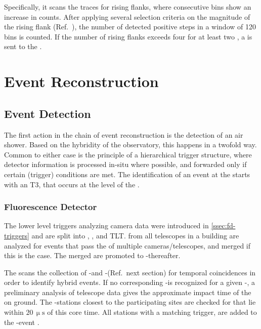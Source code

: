 Specifically, it scans the \LPMT traces for rising flanks, where consecutive 
bins show an increase in \ADC counts. After applying several selection criteria
on the magnitude of the rising flank (Ref.\ 
\cite{colemanNewTriggerSettings2018}), the number of detected positive steps in
a window of 120 bins is counted. If the number of rising flanks exceeds four 
for at least two \LPMTs, a \TTWO is sent to the \CDAS.


\section{Event Reconstruction}
\label{sec:event-reconstruction}

\halflift

\subsection{Event Detection}
\label{ssec:cdas}

The first action in the chain of \EAS event reconstruction is the detection of
an air shower. Based on the hybridity of the observatory, this happens in a 
twofold way. Common to either case is the principle of a hierarchical trigger
structure, where detector information is processed in-situ where possible, and 
forwarded only if certain (trigger) conditions are met. The identification of
an \EAS event at the \PAO starts with an \acf{T3}, that occurs at the level of
the \CDAS.

\subsubsection{Fluorescence Detector}

The lower level triggers analyzing camera data were introduced in 
\cref{ssec:fd-triggers} and are split into \FLT, \SLT, and \acf{TLT}. \TLTs 
from all telescopes in a building are analyzed for events that pass the \FOV of
multiple cameras/telescopes, and merged if this is the case. The merged \TLTs 
are promoted to \FD-\TTHREEs thereafter.

The \CDAS scans the collection of \FD-\TTHREEs and \SD-\TTHREEs (Ref.\ next 
section) for temporal coincidences in order to identify hybrid events. If no
corresponding \SD-\TTHREE is recognized for a given \FD-\TTHREE, a preliminary
analysis of telescope data gives the approximate impact time of the \EAS on 
ground. The \SD-stations closest to the participating \FD sites are checked for
\TTWOs that lie within $20\,\upmu\mathrm{s}$ of this core time. All stations 
with a matching trigger, are added to the \FD-event 
\cite{abrahamFluorescenceDetectorPierre2010, 
thepierreaugercollaborationPierreAugerCosmic2015}.

